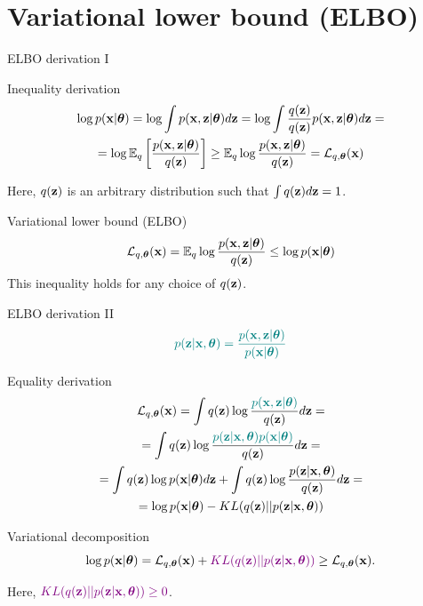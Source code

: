 \documentclass{beamer}
\begin{document}
\section{Variational lower bound (ELBO)}
\begin{frame}{ELBO derivation I}
	\begin{block}{Inequality derivation}
		\vspace{-0.7cm}
		\begin{multline*}
			\log p(\mathbf{x}| \boldsymbol{\theta}) 
			= \log \int p(\mathbf{x}, \mathbf{z} | \boldsymbol{\theta}) d\mathbf{z} = \log \int \frac{q(\mathbf{z})}{q(\mathbf{z})} p(\mathbf{x}, \mathbf{z} | \boldsymbol{\theta}) d\mathbf{z} = \\
			= \log \mathbb{E}_{q} \left[\frac{p(\mathbf{x}, \mathbf{z}| \boldsymbol{\theta})}{q(\mathbf{z})} \right] \geq \mathbb{E}_{q} \log \frac{p(\mathbf{x}, \mathbf{z}| \boldsymbol{\theta})}{q(\mathbf{z})} = \mathcal{L}_{q, \boldsymbol{\theta}}(\mathbf{x})
		\end{multline*}
		\vspace{-0.3cm}
	\end{block}
	Here, $q(\mathbf{z})$ is an arbitrary distribution such that $\int q(\mathbf{z}) d\mathbf{z} = 1$.
	\begin{block}{Variational lower bound (ELBO)}
		\[
			 \mathcal{L}_{q, \boldsymbol{\theta}}(\mathbf{x}) = \mathbb{E}_{q} \log \frac{p(\mathbf{x}, \mathbf{z}| \boldsymbol{\theta})}{q(\mathbf{z})}  \leq \log p(\mathbf{x}| \boldsymbol{\theta}) 
		\]
		This inequality holds for any choice of $q(\mathbf{z})$.
	\end{block}
\end{frame}
\begin{frame}{ELBO derivation II}
	\vspace{-0.3cm}
	\[
		{\color{teal}p(\mathbf{z}|\mathbf{x}, \boldsymbol{\theta}) = \frac{p(\mathbf{x}, \mathbf{z} | \boldsymbol{\theta})}{p(\mathbf{x}| \boldsymbol{\theta})}}
	\]
	\vspace{-0.4cm}
	\begin{block}{Equality derivation}
		\vspace{-0.7cm}
		\begin{multline*}
			\mathcal{L}_{q, \boldsymbol{\theta}}(\mathbf{x}) = \int q(\mathbf{z}) \log \frac{\color{teal}p(\mathbf{x}, \mathbf{z} | \boldsymbol{\theta})}{q(\mathbf{z})}d\mathbf{z} = \\ 
			= \int q(\mathbf{z}) \log \frac{\color{teal}p(\mathbf{z}|\mathbf{x}, \boldsymbol{\theta})p(\mathbf{x}| \boldsymbol{\theta})}{q(\mathbf{z})}d\mathbf{z} = \\
			= \int q(\mathbf{z}) \log p(\mathbf{x}| \boldsymbol{\theta}) d\mathbf{z} + \int q(\mathbf{z}) \log \frac{p(\mathbf{z}|\mathbf{x}, \boldsymbol{\theta})}{q(\mathbf{z})}d\mathbf{z} = \\
			= \log p(\mathbf{x}| \boldsymbol{\theta}) - KL(q(\mathbf{z}) || p(\mathbf{z}|\mathbf{x}, \boldsymbol{\theta}))
		\end{multline*}
	\end{block}
	\vspace{-0.7cm}
	\begin{block}{Variational decomposition}
		\vspace{-0.2cm}
		\[
			\log p(\mathbf{x}| \boldsymbol{\theta}) = \mathcal{L}_{q, \boldsymbol{\theta}}(\mathbf{x}) + {\color{violet}KL(q(\mathbf{z}) || p(\mathbf{z}|\mathbf{x}, \boldsymbol{\theta}))} \geq \mathcal{L}_{q, \boldsymbol{\theta}}(\mathbf{x}).
		\]
	\end{block}
	Here, ${\color{violet}KL(q(\mathbf{z}) || p(\mathbf{z}|\mathbf{x}, \boldsymbol{\theta})) \geq 0}$.
\end{frame}
\end{document}
